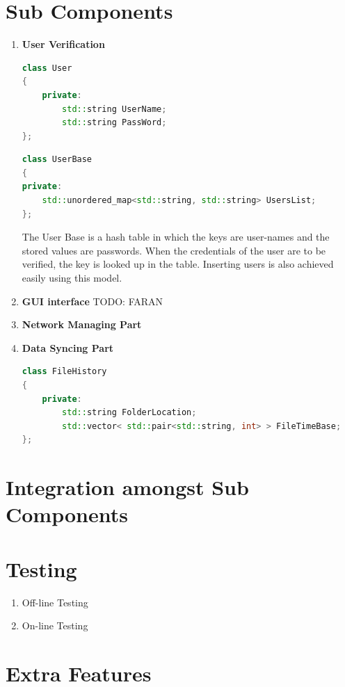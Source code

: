 \documentclass{article}
\begin{document}
	\section{Sub Components}
		\begin{enumerate}
			\item \textbf{User Verification}
			\begin{lstlisting}[language=C++, caption={Class Parameters for User}]
class User
{
	private:
		std::string UserName;
		std::string PassWord;	
};
			\end{lstlisting}
			\begin{lstlisting}[language=C++, caption={Class Parameters for User}]
class UserBase
{
private:
	std::unordered_map<std::string, std::string> UsersList;
};
			\end{lstlisting}
			The User Base is a hash table in which the keys are user-names and the stored values are passwords. When the credentials of the user are to be verified, the key is looked up in the table. Inserting users is also achieved easily using this model.
			
			\item \textbf{GUI interface} 
				\newline
				TODO: FARAN
			\item \textbf{Network Managing Part}
			\item \textbf{Data Syncing Part}
				\newline
				\begin{lstlisting}[language=C++, caption={Class Parameters for File History}]
class FileHistory
{
	private:
		std::string FolderLocation;
		std::vector< std::pair<std::string, int> > FileTimeBase;
};
			\end{lstlisting}
			

		\end{enumerate}
	\section{Integration amongst Sub Components}

	\section{Testing}
		\begin{enumerate}
			\item Off-line Testing
			\item On-line Testing
		\end{enumerate}

	\section{Extra Features}
\end{document}
